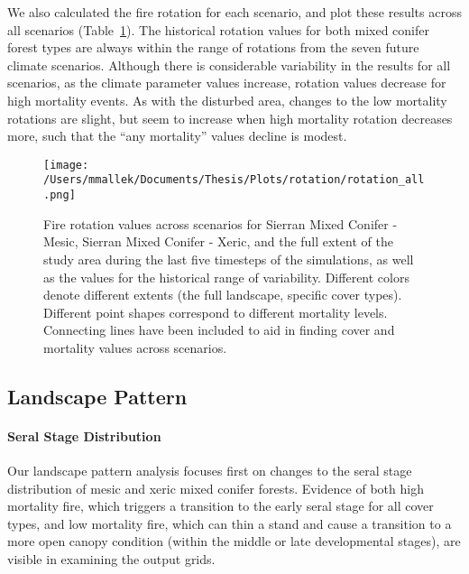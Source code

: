 We also calculated the fire rotation for each scenario, and plot these results across all scenarios (Table~\ref{fig:frotation}). The historical rotation values for both mixed conifer forest types are always within the range of rotations from the seven future climate scenarios. Although there is considerable variability in the results for all scenarios, as the climate parameter values increase, rotation values decrease for high mortality events. As with the disturbed area, changes to the low mortality rotations are slight, but seem to increase when high mortality rotation decreases more, such that the ``any mortality'' values decline is modest. 



\begin{figure}
\centering
\texttt{[image: /Users/mmallek/Documents/Thesis/Plots/rotation/rotation\_all.png]}
\caption{Fire rotation values across scenarios for Sierran Mixed Conifer - Mesic, Sierran Mixed Conifer - Xeric, and the full extent of the study area during the last five timesteps of the simulations, as well as the values for the historical range of variability. Different colors denote different extents (the full landscape, specific cover types). Different point shapes correspond to different mortality levels. Connecting lines have been included to aid in finding cover and mortality values across scenarios.}
\label{fig:frotation}
\end{figure}



\subsection*{Landscape Pattern}

\paragraph{Seral Stage Distribution} Our landscape pattern analysis focuses first on changes to the seral stage distribution of mesic and xeric mixed conifer forests. Evidence of both high mortality fire, which triggers a transition to the early seral stage for all cover types, and low mortality fire, which can thin a stand and cause a transition to a more open canopy condition (within the middle or late developmental stages), are visible in examining the output grids. 

